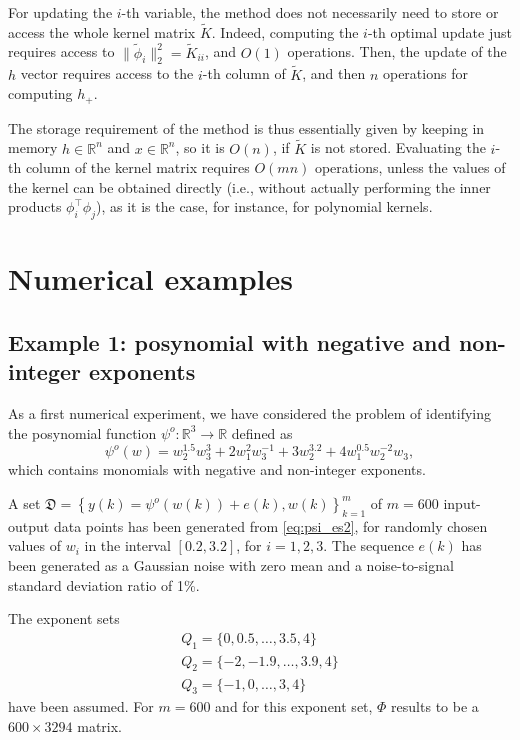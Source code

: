 \documentclass[11pt]{article}
\newcommand{\tran}{^{\top}}
\newcommand{\Real}[1]{ { {\mathbb R}^{#1} } }
\begin{document}
For updating the $i$-th variable, the method does not necessarily need to store or access the whole kernel matrix
$\tilde K$. Indeed, computing the $i$-th optimal update just requires access to $\|\tilde \phi_i\|_2^2 = \tilde K_{ii}$, and $O(1)$ operations. Then, the update of the $h$ vector requires access to the $i$-th column
of $\tilde K$, and then $n$ operations for computing $h_+$.

The storage requirement of the method is thus essentially given by keeping in memory  $h\in\Real{n}$
and $x\in\Real{n}$, so it is $O(n)$, if $\tilde K$ is not stored. Evaluating the $i$-th column of the kernel matrix requires $O(mn)$ operations, unless the values of the kernel can be obtained directly (i.e., without actually performing the inner products $\phi_i\tran \phi_j$), as it is the case, for instance, for polynomial kernels.

\section{Numerical examples}
\label{sec:numes}

\subsection{Example 1: posynomial with negative and non-integer exponents}

\label{sub:toy_example}

As a first numerical experiment, we have considered the problem of
identifying the posynomial function $\psi^{o}:\mathbb{R}^{3}\rightarrow\mathbb{R}$
defined as
\begin{equation}
\psi^{o}(w)=w_{2}^{1.5}w_{3}^{3}+2w_{1}^{2}w_{3}^{-1}+3w_{2}^{3.2}+4w_{1}^{0.5}w_{2}^{-2}w_{3},\label{eq:psi_es2}
\end{equation}
which contains monomials with negative
and non-integer exponents. 

A set $\mathfrak{D}=\left\{ y(k)=\psi^{o}(w(k))+e(k),w(k)\right\} _{k=1}^{m}$
of $m=600$ input-output data points has been generated from \eqref{eq:psi_es2},
for randomly chosen values of $w_{i}$ in the interval $[0.2,3.2]$,
for $i=1,2,3$. The sequence $e(k)$ has been generated as a Gaussian
noise with zero mean and a noise-to-signal standard deviation ratio
of 1\%. 

The exponent sets 
\[
\begin{array}{l}
Q_{1}=\{0,0.5,\ldots,3.5,4\}\\
Q_{2}=\{-2,-1.9,\ldots,3.9,4\}\\
Q_{3}=\{-1,0,\ldots,3,4\}
\end{array}
\]
have been assumed. For $m=600$ and for this exponent set, $\Phi$
results to be a $600\times3294$ matrix.
\end{document}
